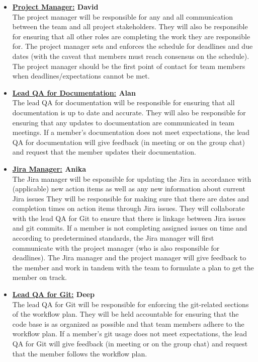 \documentclass{article}
\begin{document}
\begin{itemize}
	\item \textbf{\underline{Project Manager:} David} \\
	The project manager will be responsible for any and all communication between the team and all project stakeholders. 
	They will also be responsible for ensuring that all other roles are completing the work they are responsible for. 
	The project manager sets and enforces the schedule for deadlines and due dates (with the caveat that members must reach consensus on the schedule). 
	The project manager should be the first point of contact for team members when deadlines/expectations cannot be met. 

	\item \textbf{\underline{Lead QA for Documentation:} Alan} \\
	The lead QA for documentation will be responsible for ensuring that all documentation is up to date and accurate.
	They will also be responsible for ensuring that any updates to documentation are communicated in team meetings. 
	If a member's documentation does not meet expectations, the lead QA for documentation will give feedback (in meeting or on the group chat) 
	and request that the member updates their documentation.\\
	
	\item \textbf{\underline{Jira Manager:} Anika} \\
	The Jira manager will be esponsible for updating the Jira in accordance with (applicable) new action items as well as any new information about current Jira issues 
	They will be responsible for making sure that there are dates and completion times on action items through Jira issues. 
	They will collaborate with the lead QA for Git to ensure that there is linkage between Jira issues and git commits. 
	If a member is not completing assigned issues on time and according to predetermined standards, the Jira manager will first 
	communicate with the project manager (who is also responsible for deadlines).
	The Jira manager and the project manager will give feedback to the member and work in tandem with the team to formulate a plan to get the member on track.\\

	\item \textbf{\underline{Lead QA for Git:} Deep} \\
	The lead QA for Git will be responsible for enforcing the git-related sections of the workflow plan. 
	They will be held accountable for ensuring that the code base is as organized as possible and that team members adhere to the workflow plan.
	If a member's git usage does not meet expectations, the lead QA for Git will give feedback (in meeting or on the group chat) and request that the member follows the workflow plan.\\


\end{itemize}
\end{document}
